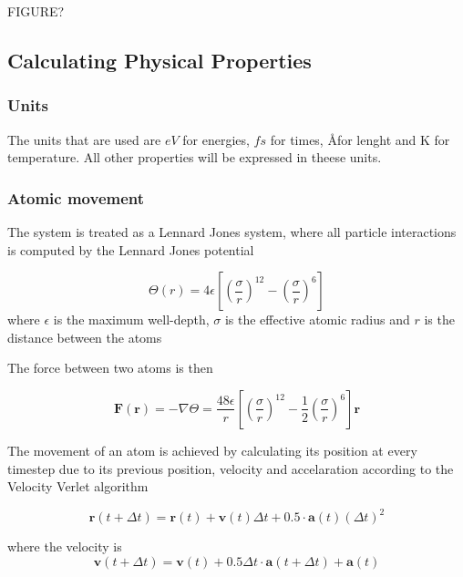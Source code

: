 \documentclass[12pt,a4paper]{article}
\begin{document}
FIGURE?


\subsection{Calculating Physical Properties}
\label{sec:calculating_physical_properties}

\subsubsection{Units}
The units that are used are \(eV\) for energies, \(fs\) for times,  \AA for lenght and K for temperature. All other properties will be expressed in theese units. 


\subsubsection{Atomic movement}
The system is treated as a Lennard Jones system, where all particle interactions is computed by the Lennard Jones potential 

\begin{equation}
\label{eq:LJ}
\Theta(r)=4 \epsilon \left[\left(\frac{\sigma}{r}\right)^{12} - \left(\frac{\sigma}{r}\right)^6\right]
\end{equation}
where \( \epsilon\) is the maximum well-depth, \( \sigma \) is the effective atomic radius and \( r\) is the distance between the atoms

The force between two atoms is then

\begin{equation}
\mathbf F(\mathbf r) = - \nabla \Theta = \frac{48\epsilon}{r} \left[\left(\frac{\sigma}{r}\right)^{12} - \frac 1 2 \left(\frac{\sigma}{r}\right)^6\right] \mathbf r
\end{equation}

The movement of an atom is achieved by calculating its position at every timestep due to its previous position, velocity and accelaration according to the Velocity Verlet algorithm

\begin{equation}
\label{eq:newPos}
\mathbf r(t+\Delta t) =\mathbf r(t) + \mathbf v(t)\Delta t + 0.5 \cdot \mathbf a(t) (\Delta t)^2
\end{equation}

where the velocity is 
\begin{equation}
\label{eq:velVerlet}
\mathbf v(t+\Delta t) = \mathbf v(t) + 0.5\Delta t  \cdot \mathbf a(t+\Delta t) + \mathbf a(t)
\end{equation}
\end{document}
